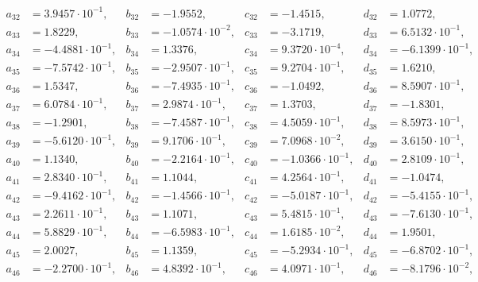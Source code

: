 \begin{align*}
  a_{ 32 } &= 3.9457 \cdot 10^{ -1 }, & b_{ 32 } &= -1.9552, & c_{ 32 } &= -1.4515, & d_{ 32 } &= 1.0772, \\ 
  a_{ 33 } &= 1.8229, & b_{ 33 } &= -1.0574 \cdot 10^{ -2 }, & c_{ 33 } &= -3.1719, & d_{ 33 } &= 6.5132 \cdot 10^{ -1 }, \\ 
  a_{ 34 } &= -4.4881 \cdot 10^{ -1 }, & b_{ 34 } &= 1.3376, & c_{ 34 } &= 9.3720 \cdot 10^{ -4 }, & d_{ 34 } &= -6.1399 \cdot 10^{ -1 }, \\ 
  a_{ 35 } &= -7.5742 \cdot 10^{ -1 }, & b_{ 35 } &= -2.9507 \cdot 10^{ -1 }, & c_{ 35 } &= 9.2704 \cdot 10^{ -1 }, & d_{ 35 } &= 1.6210, \\ 
  a_{ 36 } &= 1.5347, & b_{ 36 } &= -7.4935 \cdot 10^{ -1 }, & c_{ 36 } &= -1.0492, & d_{ 36 } &= 8.5907 \cdot 10^{ -1 }, \\ 
  a_{ 37 } &= 6.0784 \cdot 10^{ -1 }, & b_{ 37 } &= 2.9874 \cdot 10^{ -1 }, & c_{ 37 } &= 1.3703, & d_{ 37 } &= -1.8301, \\ 
  a_{ 38 } &= -1.2901, & b_{ 38 } &= -7.4587 \cdot 10^{ -1 }, & c_{ 38 } &= 4.5059 \cdot 10^{ -1 }, & d_{ 38 } &= 8.5973 \cdot 10^{ -1 }, \\ 
  a_{ 39 } &= -5.6120 \cdot 10^{ -1 }, & b_{ 39 } &= 9.1706 \cdot 10^{ -1 }, & c_{ 39 } &= 7.0968 \cdot 10^{ -2 }, & d_{ 39 } &= 3.6150 \cdot 10^{ -1 }, \\ 
  a_{ 40 } &= 1.1340, & b_{ 40 } &= -2.2164 \cdot 10^{ -1 }, & c_{ 40 } &= -1.0366 \cdot 10^{ -1 }, & d_{ 40 } &= 2.8109 \cdot 10^{ -1 }, \\ 
  a_{ 41 } &= 2.8340 \cdot 10^{ -1 }, & b_{ 41 } &= 1.1044, & c_{ 41 } &= 4.2564 \cdot 10^{ -1 }, & d_{ 41 } &= -1.0474, \\ 
  a_{ 42 } &= -9.4162 \cdot 10^{ -1 }, & b_{ 42 } &= -1.4566 \cdot 10^{ -1 }, & c_{ 42 } &= -5.0187 \cdot 10^{ -1 }, & d_{ 42 } &= -5.4155 \cdot 10^{ -1 }, \\ 
  a_{ 43 } &= 2.2611 \cdot 10^{ -1 }, & b_{ 43 } &= 1.1071, & c_{ 43 } &= 5.4815 \cdot 10^{ -1 }, & d_{ 43 } &= -7.6130 \cdot 10^{ -1 }, \\ 
  a_{ 44 } &= 5.8829 \cdot 10^{ -1 }, & b_{ 44 } &= -6.5983 \cdot 10^{ -1 }, & c_{ 44 } &= 1.6185 \cdot 10^{ -2 }, & d_{ 44 } &= 1.9501, \\ 
  a_{ 45 } &= 2.0027, & b_{ 45 } &= 1.1359, & c_{ 45 } &= -5.2934 \cdot 10^{ -1 }, & d_{ 45 } &= -6.8702 \cdot 10^{ -1 }, \\ 
  a_{ 46 } &= -2.2700 \cdot 10^{ -1 }, & b_{ 46 } &= 4.8392 \cdot 10^{ -1 }, & c_{ 46 } &= 4.0971 \cdot 10^{ -1 }, & d_{ 46 } &= -8.1796 \cdot 10^{ -2 }, \\ 

\end{align*}
